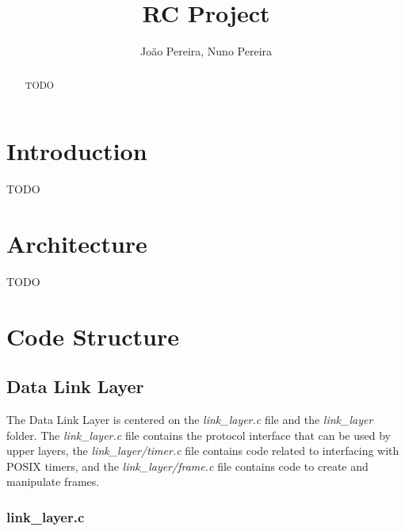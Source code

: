 \documentclass[11pt,a4paper]{article}
\title{RC Project}
\author{João Pereira, Nuno Pereira}
\begin{document}
    
\maketitle

\begin{abstract}
    TODO
\end{abstract}

\pagebreak

\tableofcontents

\pagebreak

\section{Introduction}

TODO

\section{Architecture}

TODO

\section{Code Structure}

\subsection{Data Link Layer}

The Data Link Layer is centered on the \textit{link\_layer.c} file and the \textit{link\_layer} folder.
The \textit{link\_layer.c} file contains the protocol interface that can be used by upper layers, the \textit{link\_layer/timer.c} file contains code related to interfacing with POSIX timers, and the \textit{link\_layer/frame.c} file contains code to create and manipulate frames.

\subsubsection{link\_layer.c}
\end{document}
